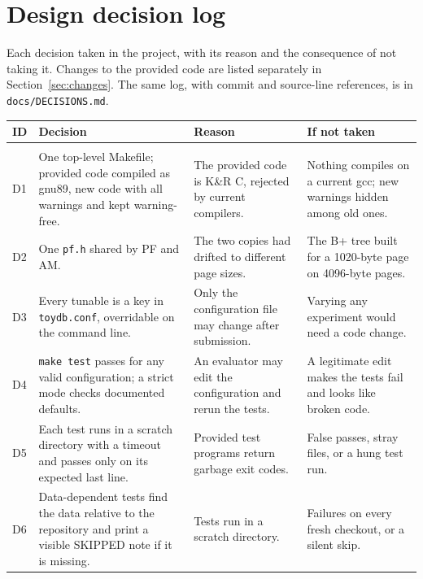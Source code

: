 \documentclass[11pt,a4paper]{article}
\renewcommand{\arraystretch}{1.15}
\begin{document}
\section{Design decision log}
\label{app:decisions}

Each decision taken in the project, with its reason and the consequence of not taking it. Changes to the provided code are listed separately in Section~\ref{sec:changes}. The same log, with commit and source-line references, is in \texttt{docs/DECISIONS.md}.

\small\renewcommand{\arraystretch}{1.05}
\begin{longtable}{>{\raggedright\arraybackslash}p{0.7cm}>{\raggedright\arraybackslash}p{5.2cm}>{\raggedright\arraybackslash}p{4.4cm}>{\raggedright\arraybackslash}p{4.3cm}}
\toprule
ID & Decision & Reason & If not taken \\
\midrule
\endhead
\multicolumn{4}{l}{\textit{Build, configuration and testing}} \\
D1 & One top-level Makefile; provided code compiled as gnu89, new code with all warnings and kept warning-free. & The provided code is K\&R C, rejected by current compilers. & Nothing compiles on a current gcc; new warnings hidden among old ones. \\
D2 & One \texttt{pf.h} shared by PF and AM. & The two copies had drifted to different page sizes. & The B+ tree built for a 1020-byte page on 4096-byte pages. \\
D3 & Every tunable is a key in \texttt{toydb.conf}, overridable on the command line. & Only the configuration file may change after submission. & Varying any experiment would need a code change. \\
D4 & \texttt{make test} passes for any valid configuration; a strict mode checks documented defaults. & An evaluator may edit the configuration and rerun the tests. & A legitimate edit makes the tests fail and looks like broken code. \\
D5 & Each test runs in a scratch directory with a timeout and passes only on its expected last line. & Provided test programs return garbage exit codes. & False passes, stray files, or a hung test run. \\
D6 & Data-dependent tests find the data relative to the repository and print a visible SKIPPED note if it is missing. & Tests run in a scratch directory. & Failures on every fresh checkout, or a silent skip. \\

\end{longtable}
\end{document}
